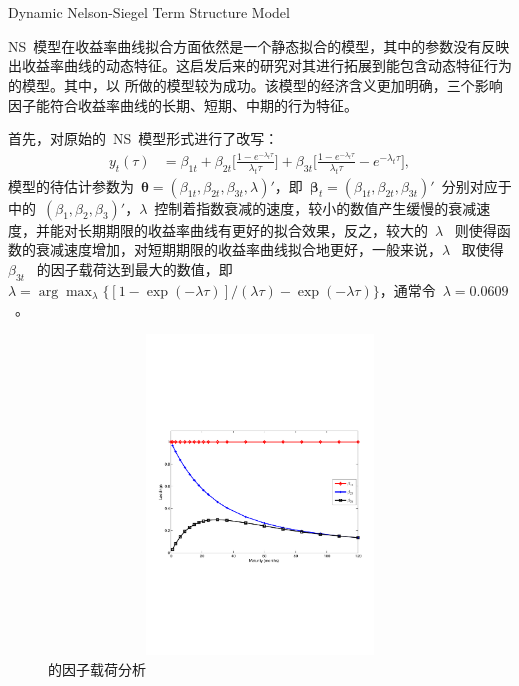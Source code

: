 \section{\dns}  {Dynamic Nelson-Siegel Term Structure Model}\label{chap02-dev}

NS~模型在收益率曲线拟合方面依然是一个静态拟合的模型，其中的参数没有反映出收益率曲线的动态特征。这启发后来的研究对其进行拓展到能包含\yc 动态特征行为的模型。其中，以 所做的\dns 模型较为成功。该模型的经济含义更加明确，三个影响因子能符合收益率曲线的长期、短期、中期的行为特征。

首先，对原始的~NS~模型形式进行了改写：
\begin{align}\label{dns}
    y_{t}(\tau) &= \beta_{1t}
        + \beta_{2t} \big[\frac{1-e^{-\lambda_{t} \tau}} {\lambda_{t} \tau} \big]
        + \beta_{3t}\big[\frac{1-e^{-\lambda_{t} \tau}} {\lambda_{t} \tau} - e^{-\lambda_{t} \tau} \big],
  \end{align}
模型的待估计参数为~$\bm{\theta}=(\beta_{1t},\beta_{2t},\beta_{3t},\lambda)'$，即~$\bm{\beta}_t=(\beta_{1t},\beta_{2t},\beta_{3t})'$~分别对应于 中的~$(\beta_{1},\beta_{2},\beta_{3})'$，$\lambda$~控制着指数衰减的速度，较小的数值产生缓慢的衰减速度，并能对长期期限的收益率曲线有更好的拟合效果，反之，较大的~$\lambda$~ 则使得函数的衰减速度增加，对短期期限的收益率曲线拟合地更好，一般来说，$\lambda$~ 取使得~$\beta_{3t}$~ 的因子载荷达到最大的数值，即$\lambda=\arg \max_{\lambda}\big\{ [1-\exp{(-\lambda\tau)}]/ (\lambda \tau) - \exp{(-\lambda\tau)} \big\}$，通常令~$\lambda=0.0609$~。

  \begin{figure}%
    \includegraphics[width=15cm,height=8.5cm]{figures/tale_fig03}
    \caption{\dns 的因子载荷分析}
   \label{tale_fig03}
  \end{figure}

